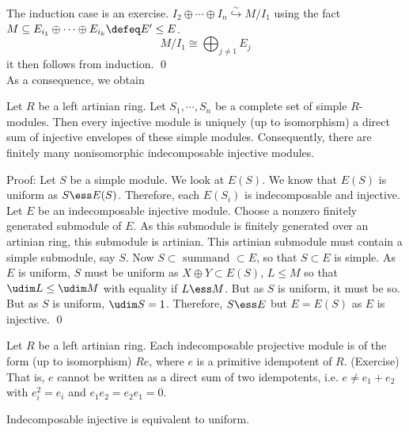 The induction case is an exercise. $I_2 \oplus \cdots \oplus I_n \stackrel{\sim}{\hookrightarrow} M/I_1$ using the fact $M \subseteq E_{i_1}\oplus \cdots \oplus E_{i_k} \defeq E' \leq E$. 
\[
M/I_1 \cong \bigoplus_{j \neq 1} E_j
\]
it then follows from induction. \qed \\

As a consequence, we obtain 

\begin{thm}
Let $R$ be a left artinian ring. Let $S_1,\cdots,S_n$ be a complete set of simple $R$-modules. Then every injective module is uniquely (up to isomorphism) a direct sum of injective envelopes of these simple modules. Consequently, there are finitely many nonisomorphic indecomposable injective modules.
\end{thm}

Proof: Let $S$ be a simple module. We look at $E(S)$. We know that $E(S)$ is uniform as $S \ess E(S)$. Therefore, each $E(S_i)$ is indecomposable and injective. Let $E$ be an indecomposable injective module. Choose a nonzero finitely generated submodule of $E$. As this submodule is finitely generated over an artinian ring, this submodule is artinian. This artinian submodule must contain a simple submodule, say $S$. Now $S \subset \text{ summand } \subset E$, so that $S \subset E$ is simple. As $E$ is uniform, $S$ must be uniform as $X \oplus Y \subset E(S)$, $L \leq M$ so that $\udim L \leq \udim M$ with equality if $L \ess M$. But as $S$ is uniform, it must be so. But as $S$ is uniform, $\udim S=1$. Therefore, $S \ess E$ but $E=E(S)$ as $E$ is injective. \qed \\

\begin{rem}
Let $R$ be a left artinian ring. Each indecomposable projective module is of the form (up to isomorphism) $Re$, where $e$ is a primitive idempotent of $R$. (Exercise) That is, $e$ cannot be written as a direct sum of two idempotents, i.e. $e \neq e_1+e_2$ with $e_i^2=e_i$ and $e_1e_2=e_2e_1=0$.
\end{rem}

\begin{rem}
Indecomposable injective is equivalent to uniform. 
\end{rem}

